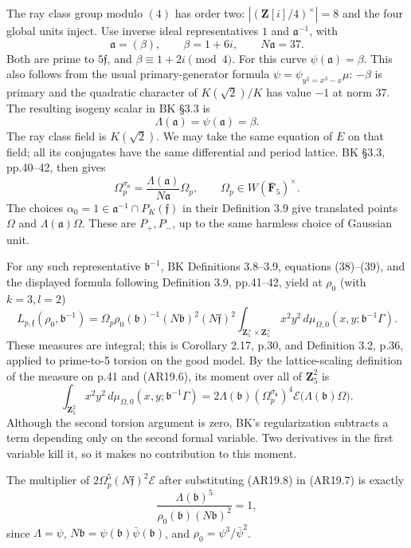 The ray class group modulo \((4)\) has order two:
\(|(\mathbf Z[i]/4)^\times|=8\) and the four global units inject. Use
inverse ideal representatives \(1\) and \(\mathfrak a^{-1}\), with \[
\mathfrak a=(\beta),\qquad \beta=1+6i,\qquad N\mathfrak a=37.
\] Both are prime to \(5\mathfrak f\), and \(\beta\equiv1+2i\pmod4\).
For this curve \(\psi(\mathfrak a)=\beta\). This also follows from the
usual primary-generator formula \(\psi=\psi_{y^2=x^3-x}\mu\): \(-\beta\)
is primary and the quadratic character of \(K(\sqrt2)/K\) has value
\(-1\) at norm 37. The resulting isogeny scalar in BK §3.3 is \[
\Lambda(\mathfrak a)=\psi(\mathfrak a)=\beta.
\] The ray class field is \(K(\sqrt2)\). We may take the same equation
of \(E\) on that field; all its conjugates have the same differential
and period lattice. BK §3.3, pp.40--42, then gives \[
\Omega_p^{\sigma_{\mathfrak a}}
 =\frac{\Lambda(\mathfrak a)}{N\mathfrak a}\Omega_p,
\qquad \Omega_p\in W(\overline{\mathbf F}_5)^\times.
\tag{AR19.6}
\] The choices \(\alpha_0=1\in\mathfrak a^{-1}\cap P_K(\mathfrak f)\) in
their Definition 3.9 give translated points \(\Omega\) and
\(\Lambda(\mathfrak a)\Omega\). These are \(P_+,P_-\), up to the same
harmless choice of Gaussian unit.

For any such representative \(\mathfrak b^{-1}\), BK Definitions
3.8--3.9, equations (38)--(39), and the displayed formula following
Definition 3.9, pp.41--42, yield at \(\rho_0\) (with \(k=3,l=2\)) \[
L_{p,\mathfrak f}(\rho_0,\mathfrak b^{-1})
 =\Omega_p\rho_0(\mathfrak b)^{-1}(N\mathfrak b)^2(N\mathfrak f)^2
 \int_{\mathbf Z_5^\times\times\mathbf Z_5^\times}
       x^2y^2\,d\mu_{\Omega,0}(x,y;\mathfrak b^{-1}\Gamma).
\tag{AR19.7}
\] These measures are integral; this is Corollary 2.17, p.30, and
Definition 3.2, p.36, applied to prime-to-5 torsion on the good model.
By the lattice-scaling definition of the measure on p.41 and (AR19.6),
its moment over all of \(\mathbf Z_5^2\) is \[
\int_{\mathbf Z_5^2}x^2y^2\,d\mu_{\Omega,0}(x,y;\mathfrak b^{-1}\Gamma)
 =2\Lambda(\mathfrak b)
       (\Omega_p^{\sigma_{\mathfrak b}})^4
       \mathcal E\bigl(\Lambda(\mathfrak b)\Omega\bigr).
\tag{AR19.8}
\] Although the second torsion argument is zero, BK's regularization
subtracts a term depending only on the second formal variable. Two
derivatives in the first variable kill it, so it makes no contribution
to this moment.

The multiplier of \(2\Omega_p^5(N\mathfrak f)^2\mathcal E\) after
substituting (AR19.8) in (AR19.7) is exactly \[
\frac{\Lambda(\mathfrak b)^5}
 {\rho_0(\mathfrak b)(N\mathfrak b)^2}=1,
\tag{AR19.9}
\] since \(\Lambda=\psi\),
\(N\mathfrak b=\psi(\mathfrak b)\bar\psi(\mathfrak b)\), and
\(\rho_0=\psi^3/\bar\psi^2\).

